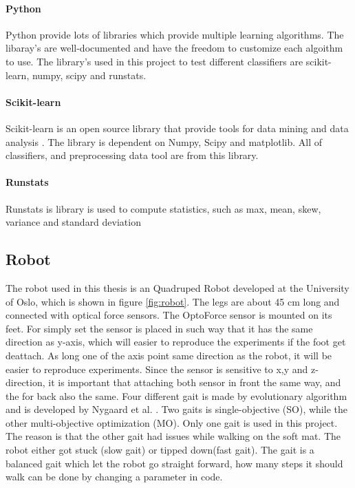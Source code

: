 \documentclass[USenglish]{ifimaster}  %
\begin{document}
\paragraph{Python}
Python provide lots of libraries which provide multiple learning algorithms. The libaray's are well-documented and have the freedom to customize each algoithm to use. The library's used in this project to test different classifiers are scikit-learn, numpy, scipy and runstats.

\paragraph{Scikit-learn}
Scikit-learn is an open source library that provide tools for data mining and data analysis \cite{scikit-learn}. The library is dependent on Numpy, Scipy and matplotlib. All of classifiers, and preprocessing data tool are from this library. 

\paragraph{Runstats}
Runstats is library is used to compute statistics, such as max, mean, skew, variance and standard deviation \cite{runstats}


\subsection{Robot}
The robot used in this thesis is an Quadruped Robot developed at the University of Oslo, which is shown in figure \ref{fig:robot}. The legs are about 45 cm long and connected with optical force sensors. The OptoForce sensor is mounted on its feet. For simply set the sensor is placed in such way that it has the same direction as y-axis, which will easier to reproduce the experiments if the foot get deattach. As long one of the axis point same direction as the robot, it will be easier to reproduce experiments. Since the sensor is sensitive to x,y and z-direction, it is important that attaching both sensor in front the same way, and the for back also the same. Four different gait is made by evolutionary algorithm and is developed by Nygaard et al. \cite{7850167}. Two gaits is single-objective (SO), while the other multi-objective optimization
(MO). Only one gait is used in this project. The reason is that the other gait had issues while walking on the soft mat. The robot either got stuck (slow gait) or tipped down(fast gait). The gait is a balanced gait which let the robot go straight forward, how many steps it should walk can be done by changing a parameter in code. 
\end{document}
